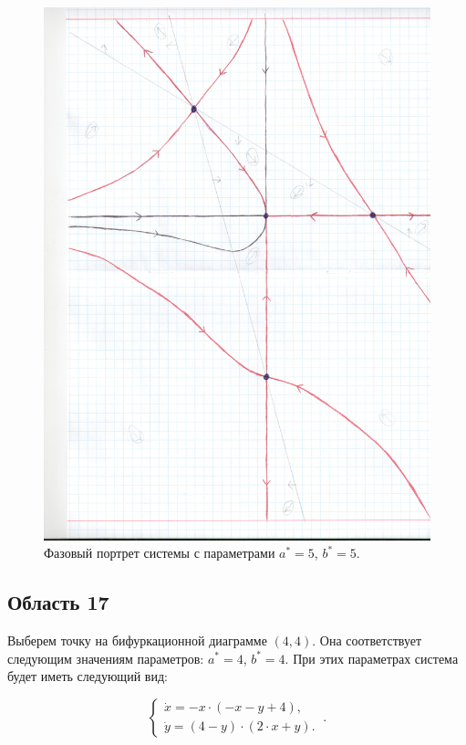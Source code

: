 \begin{figure}[h]
	
	\includegraphics[width=\textwidth]{phptr/(5, 15).jpg}
	\centering
	\caption{\label{fig:phportr16} Фазовый портрет системы с параметрами $a^\ast = 5$, $b^\ast = 5$.}
	
\end{figure}

\subsection{Область 17}

Выберем точку на бифуркационной диаграмме $(4, 4)$. Она соответствует следующим значениям параметров:  $a^\ast = 4$, $b^\ast = 4$. При этих параметрах система будет иметь следующий вид: 

$$
\left \lbrace 
\begin{matrix} 
	\dot{x} = -x \cdot (-x - y + 4), \\
	\dot{y} = (4 - y) \cdot (2 \cdot x + y). \
\end{matrix} 
\right . .$$


